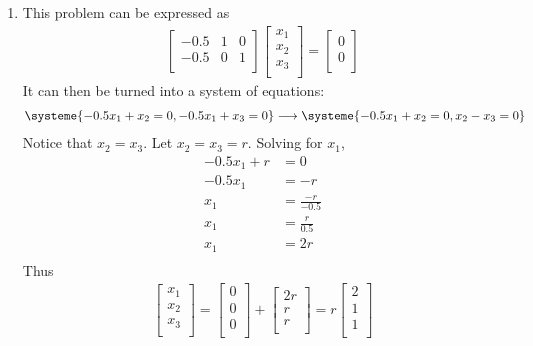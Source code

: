 \documentclass[letterpaper,12pt]{report}
\begin{document}
\begin{enumerate}[label=\alph*.]
\item This problem can be expressed as
\begin{align*}
  \begin{bmatrix}
    -0.5 & 1 & 0 \\
    -0.5 & 0 & 1 \\
  \end{bmatrix}
  \begin{bmatrix}
    x_1 \\ x_2 \\ x_3 \\
  \end{bmatrix} =
  \begin{bmatrix}
    0 \\ 0 \\
  \end{bmatrix}
\end{align*}
It can then be turned into a system of equations:
\begin{align*}
  \systeme{
    -0.5x_1 + x_2 = 0,
    -0.5x_1 + x_3 = 0
  } \longrightarrow
  \systeme{
    -0.5x_1 + x_2 = 0,
    x_2 - x_3 = 0
  }
\end{align*}
Notice that $x_2 = x_3$. Let $x_2 = x_3 = r$. Solving for $x_1$,
\begin{align*}
  -0.5x_1 + r & = 0               \\
  -0.5x_1     & = -r              \\
  x_1         & = \frac{-r}{-0.5} \\
  x_1         & = \frac{r}{0.5}   \\
  x_1         & = 2r              \\
\end{align*}
Thus
\begin{align*}
  \begin{bmatrix}
  x_1 \\ x_2 \\ x_3 \\
  \end{bmatrix} =
  \begin{bmatrix}
  0 \\ 0 \\ 0 \\
  \end{bmatrix} +
  \begin{bmatrix}
  2r \\ r \\ r \\
  \end{bmatrix} = r
  \begin{bmatrix}
  2 \\ 1 \\ 1 \\
  \end{bmatrix}
\end{align*}

\end{enumerate}
\end{document}
